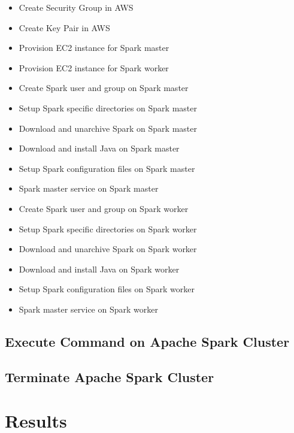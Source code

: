 \begin{itemize}
	\item Create Security Group in AWS
	\item Create Key Pair in AWS
	\item Provision EC2 instance for Spark master
	\item Provision EC2 instance for Spark worker
	\item Create Spark user and group on Spark master
	\item Setup Spark specific directories on Spark master
	\item Download and unarchive Spark  on Spark master
	\item Download and install Java  on Spark master
	\item Setup Spark configuration files on Spark master
	\item Spark master service on Spark master
	\item Create Spark user and group on Spark worker
	\item Setup Spark specific directories on Spark worker
	\item Download and unarchive Spark  on Spark worker
	\item Download and install Java  on Spark worker
	\item Setup Spark configuration files on Spark worker
	\item Spark master service on Spark worker	
\end{itemize}

\subsection{Execute Command on Apache Spark Cluster}


\subsection{Terminate Apache Spark Cluster}


\section{Results}


